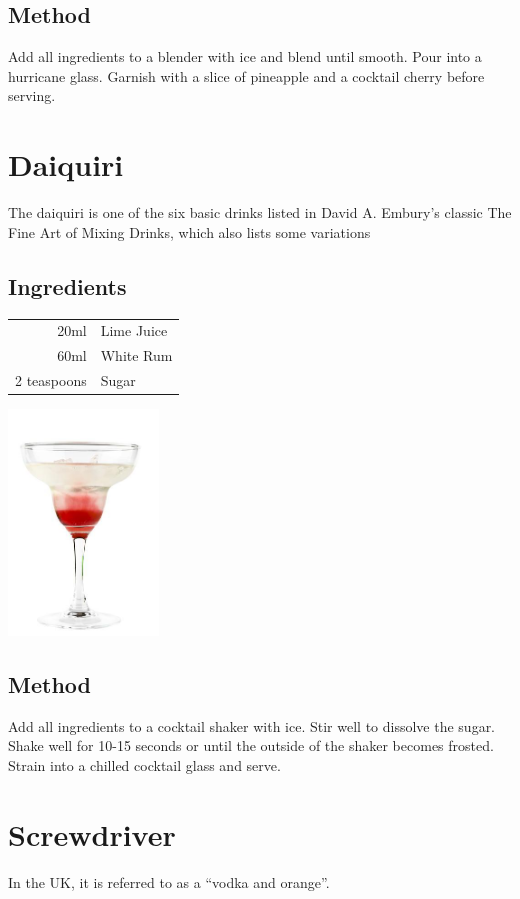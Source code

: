 \documentclass[12pt, letterpaper]{article}
\begin{document}
\subsection*{Method}
Add all ingredients to a blender with ice and blend until smooth.
Pour into a hurricane glass. Garnish with a slice of pineapple and a cocktail cherry before serving.

\pagebreak
\section{Daiquiri}
The daiquiri is one of the six basic drinks listed in David A. Embury's classic 
The Fine Art of Mixing Drinks, which also lists some variations
\subsection*{Ingredients}

\begin{multicols}{2}

\begin{tabular} { r | l}
    20ml & Lime Juice \\
    60ml & White Rum  \\
    2 teaspoons & Sugar
\end{tabular}

\includegraphics[height=6cm]{daiquiri}

\end{multicols}

\subsection*{Method}
Add all ingredients to a cocktail shaker with ice. Stir well to dissolve the sugar.
Shake well for 10-15 seconds or until the outside of the shaker becomes frosted.
Strain into a chilled cocktail glass and serve.

\pagebreak
\section{Screwdriver}
In the UK, it is referred to as a \enquote{vodka and orange}.
\end{document}
